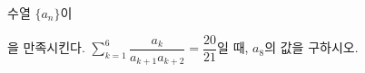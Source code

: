 수열 $\{a_n\}$이\par\smallskip{}\par\smallskip\noindent 을 만족시킨다. $\displaystyle\sum_{k=1}^{6}\dfrac{a_k}{a_{k+1}a_{k+2}}=\dfrac{20}{21}$일 때, $a_8$의 값을 구하시오.
